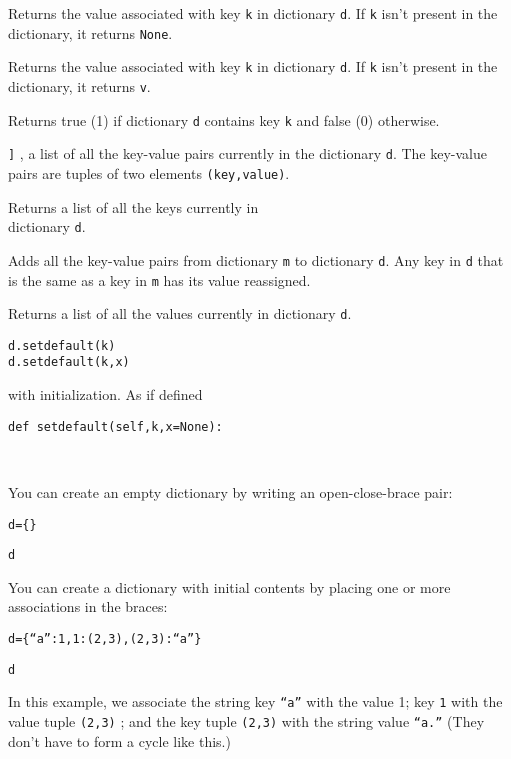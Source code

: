 Returns the value associated with
key \texttt{k} in dictionary \texttt{d}. If \texttt{k} isn't present in the
dictionary, it returns \texttt{None}.



Returns the value associated with
key \texttt{k} in dictionary \texttt{d}. If \texttt{k} isn't present in the
dictionary, it returns \texttt{v}.



Returns true (1) if dictionary
\texttt{d} contains key \texttt{k} and false (0) otherwise.




\texttt{{]}} , a list of all the key-value pairs currently in the
dictionary \texttt{d}. The key-value pairs are tuples of two elements
\texttt{(key,value)}.



Returns a list of all the keys
currently in\\
dictionary \texttt{d}.



Adds all the key-value pairs from
dictionary \texttt{m} to dictionary \texttt{d}. Any key in \texttt{d} that is
the same as a key in \texttt{m} has its value reassigned.



Returns a list of all the values
currently in dictionary \texttt{d}.

 \texttt{d.setdefault(k)\\
d.setdefault(k,x)}


with initialization. As if defined

 \texttt{def
setdefault(self,k,x=None):}











~

You can create an empty dictionary
by writing an open-close-brace pair:


\texttt{d=\{\}}


\texttt{d}



You can create a dictionary with
initial contents by placing one or more associations in the braces:


\texttt{d=\{``a'':1,1:(2,3),(2,3):``a''\}}


\texttt{d}



In this example, we associate the
string key \texttt{``a''} with the value 1; key \texttt{1} with the value
tuple \texttt{(2,3)} ; and the key tuple \texttt{(2,3)} with the string
value \texttt{``a.''} (They don't have to form a cycle like this.)

